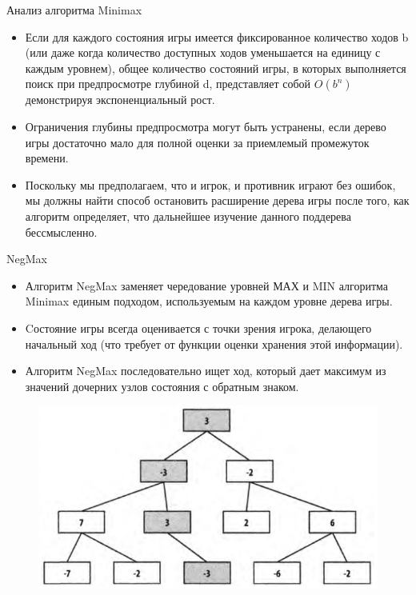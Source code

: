 \documentclass{beamer}
\begin{document}
\begin{frame}{Анализ алгоритма Minimax}
\begin{itemize}
\item Если для каждого состояния игры имеется фиксированное количество ходов b
(или даже когда количество доступных ходов уменьшается на единицу с каждым
уровнем), общее количество состояний игры, в которых выполняется поиск при
предпросмотре глубиной d, представляет собой $O(b^n)$ демонстрируя экспоненциальный рост. 
\item Ограничения глубины предпросмотра могут быть устранены, если дерево
игры достаточно мало для полной оценки за приемлемый промежуток времени.
\item Поскольку мы предполагаем, что и игрок, и противник играют
без ошибок, мы должны найти способ остановить расширение дерева игры после
того, как алгоритм определяет, что дальнейшее изучение данного поддерева бессмысленно.
\end{itemize}
\end{frame}

\begin{frame}{NegMax}
\begin{itemize}
\item Алгоритм NegMax заменяет чередование уровней МАХ и MIN алгоритма Minimax
единым подходом, используемым на каждом уровне дерева игры.
\item Cостояние игры всегда оценивается с точки зрения игрока, делающего начальный ход (что требует от функции оценки хранения этой информации).
\item Алгоритм NegMax последовательно ищет ход, который дает
максимум из значений дочерних узлов состояния с обратным знаком.
\end{itemize}
\begin{figure}[h]
\centering
\includegraphics[scale=0.35]{images/lec05-pic05.png}
\end{figure}
\end{frame}
\end{document}
